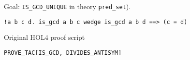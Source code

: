 \documentclass[runningheads,a4paper,draft]{svjour3}
\def\holfour{\textsf{HOL4}\xspace}
\begin{document}






%

Goal: \texttt{IS\_GCD\_UNIQUE} in theory \texttt{pred\_set}).
\begin{lstlisting}[language=SMLSmall,frame=tb]
!a b c d. is_gcd a b c wedge is_gcd a b d ==> (c = d)
\end{lstlisting}

Original \holfour proof script
\begin{lstlisting}[language=SMLSmall,frame=tb]
PROVE_TAC[IS_GCD, DIVIDES_ANTISYM]
\end{lstlisting}
\end{document}
